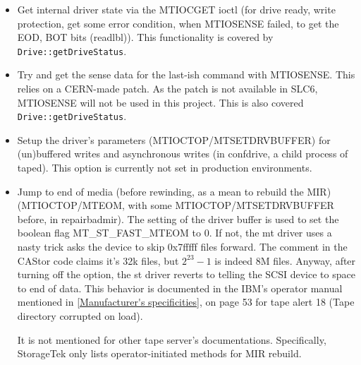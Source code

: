 \begin{itemize}
  \begin{itemize}
    \item Get internal driver state via the MTIOCGET ioctl (for drive ready, write protection, 
          get some error condition, when MTIOSENSE failed, to get the EOD, BOT bits (readlbl)).
          This functionality is covered by \verb#Drive::getDriveStatus#.
    \item Try and get the sense data for the last-ish command with MTIOSENSE. This
          relies on a CERN-made patch. As the patch is not available in SLC6, 
          MTIOSENSE will not be used in this project. This is also covered \verb#Drive::getDriveStatus#.
    \item Setup the driver's parameters (MTIOCTOP/MTSETDRVBUFFER) for (un)buffered 
          writes and asynchronous writes (in confdrive, a child process of taped).
          This option is currently not set in production environments.
    \item Jump to end of media (before rewinding, as a mean to rebuild the MIR) (MTIOCTOP/MTEOM, 
          with some MTIOCTOP/MTSETDRVBUFFER before, in repairbadmir). The setting of the driver
          buffer is used to set the boolean flag MT\_ST\_FAST\_MTEOM to 0. If not, the mt driver uses
          a nasty trick asks the device to skip 0x7fffff files forward. The comment in the CAStor code
          claims it's 32k files, but $2^{23}-1$ is indeed 8M files. Anyway, after turning off the 
          option, the st driver reverts to telling the SCSI device to space to end of data.
          This behavior is documented in the IBM's operator manual mentioned in \ref{Manufacturer's specificities},
          on page 53 for tape alert 18 (Tape directory corrupted on load).

          It is not mentioned for other tape server's documentations. Specifically, StorageTek
          only lists operator-initiated methods for MIR rebuild.


\end{itemize}
\end{itemize}
